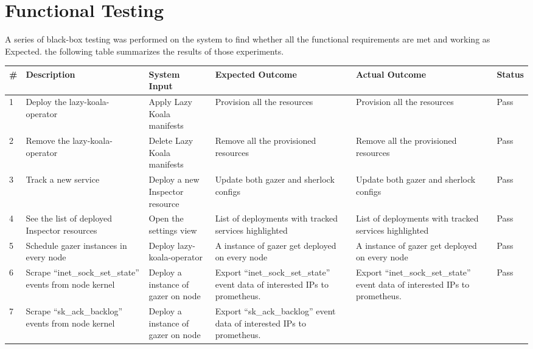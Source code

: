 \section{Functional Testing}\label{sec:functional-testing}

A series of black-box testing was performed on the system to find whether all the functional requirements are met and working as Expected. the following table summarizes the results of those experiments. 

\begin{longtable}{|p{3mm}|p{30mm}|p{27mm}|p{33mm}|p{33mm}|p{10mm}|}
    \hline
    \textbf{\#} &
      \textbf{Description} &
      \textbf{System Input} &
      \textbf{Expected Outcome} &
      \textbf{Actual Outcome} &
      \textbf{Status} \\ \hline
    1 &
      Deploy the \ac{lazy-koala-operator} &
      Apply Lazy Koala manifests &
      Provision all the resources &
      Provision all the resources &
      Pass \\ \hline
    2 &
      Remove the \ac{lazy-koala-operator} &
      Delete Lazy Koala manifests &
      Remove all the provisioned resources &
      Remove all the provisioned resources &
      Pass \\ \hline
    3 &
      Track a new service &
      Deploy a new Inspector resource &
      Update both \ac{gazer} and \ac{sherlock} configs &
      Update both \ac{gazer} and \ac{sherlock} configs &
      Pass \\ \hline
    4 &
      See the list of deployed Inspector resources &
      Open the settings view &
      List of deployments with tracked services highlighted &
      List of deployments with tracked services highlighted &
      Pass \\ \hline
    5 &
      Schedule \ac{gazer} instances in every node &
      Deploy \ac{lazy-koala-operator} &
      A instance of \ac{gazer} get deployed on every node &
      A instance of \ac{gazer} get deployed on every node &
      Pass \\ \hline
    6 &
      Scrape “inet\_sock\_set\_state” events from node kernel &
      Deploy a instance of \ac{gazer} on node &
      Export “inet\_sock\_set\_state” event data of interested IPs to prometheus. &
      Export “inet\_sock\_set\_state” event data of interested IPs to prometheus. &
      Pass \\ \hline
    7 &
      Scrape “sk\_ack\_backlog” events from node kernel &
      Deploy a instance of \ac{gazer} on node &
      Export “sk\_ack\_backlog” event data of interested IPs to prometheus. &

\end{longtable}
